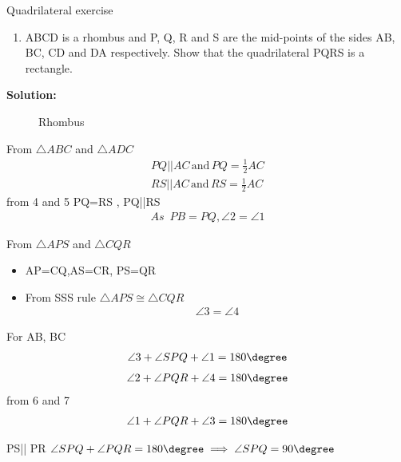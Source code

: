 \documentclass{beamer}
\newcounter{saveenumi}
\newcommand{\seti}{\setcounter{saveenumi}{\value{enumi}}}
\newcommand{\conti}{\setcounter{enumi}{\value{saveenumi}}}
\begin{document}
\begin{frame}{Quadrilateral exercise}
\begin{enumerate}
\conti
\item ABCD is a rhombus and P, Q, R and S are the
mid-points of the sides AB, BC, CD and DA
respectively. Show that the quadrilateral PQRS
is a rectangle.
\seti
\end{enumerate}
\textbf{Solution:}
\begin{figure}[!h]
\resizebox{0.3\linewidth}{!}{}
\caption{Rhombus}
\label{fig:foo}
\end{figure}
From $\triangle{ABC}$ and $\triangle{ADC}$
\begin{align}
PQ || AC \hspace{2pt}\text{and}\hspace{2pt} PQ=\frac{1}{2}AC\\
RS || AC \hspace{2pt}\text{and}\hspace{2pt} RS=\frac{1}{2}AC
\end{align}
from 4 and 5 PQ=RS , PQ||RS 
\begin{align}
 \textit{As}\hspace{6pt} PB=PQ, \angle{2} =\angle{1}
\end{align}
\end{frame}
\begin{frame}
From $\triangle{APS}$ and $\triangle{CQR}$ \\
\begin{itemize}
\item AP=CQ,AS=CR, PS=QR\\
\item From SSS rule
$\triangle{APS} \cong \triangle{CQR}$
\begin{align}
\angle{3} = \angle{4}
\end{align}
\end{itemize}
For AB, BC
\begin{align}
\angle{3}+\angle{SPQ}+\angle{1} = 180\degree
\end{align}
\begin{align*}
\angle{2}+\angle{PQR}+\angle{4}=180\degree
\end{align*}
from 6 and 7 
\begin{align}
\angle{1}+\angle{PQR}+\angle{3}=180\degree
\end{align}
\begin{center}
PS|| PR $\angle{SPQ}+\angle{PQR} =180\degree \implies \angle{SPQ}=90\degree$
\end{center}
\end{frame}
\end{document}
